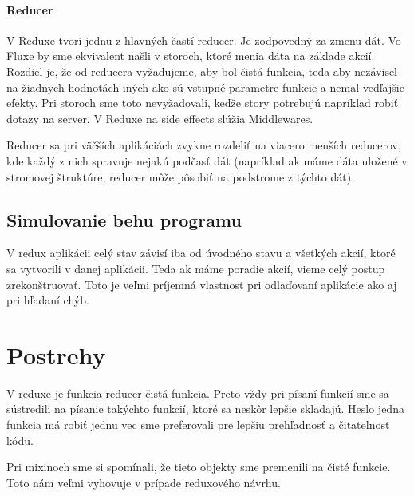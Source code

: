 \paragraph{Reducer}%
V Reduxe tvorí jednu z hlavných častí reducer. Je zodpovedný za zmenu dát. Vo Fluxe by sme ekvivalent našli v storoch, ktoré menia dáta na základe akcií. Rozdiel je, že od reducera vyžadujeme, aby bol čistá funkcia, teda aby nezávisel na žiadnych hodnotách iných ako sú vstupné parametre funkcie a nemal vedľajšie efekty. Pri storoch sme toto nevyžadovali, keďže story potrebujú napríklad robiť dotazy na server. V Reduxe na side effects slúžia Middlewares.

Reducer sa pri väčších aplikáciách zvykne rozdeliť na viacero menších reducerov, kde každý z nich spravuje nejakú podčasť dát (napríklad ak máme dáta uložené v stromovej štruktúre, reducer môže pôsobiť na podstrome z týchto dát).

\subsection{Simulovanie behu programu}
V redux aplikácii celý stav závisí iba od úvodného stavu a všetkých akcií, ktoré sa vytvorili v danej aplikácii. Teda ak máme poradie akcií, vieme celý postup zrekonštruovať. Toto je veľmi príjemná vlastnosť pri odlaďovaní aplikácie ako aj pri hľadaní chýb.

\section{Postrehy}
V reduxe je funkcia reducer čistá funkcia. Preto vždy pri písaní funkcií sme sa sústredili na písanie takýchto funkcií, ktoré sa neskôr lepšie skladajú. Heslo jedna funkcia má robiť jednu vec sme preferovali pre lepšiu prehľadnosť a čitateľnosť kódu.

Pri mixinoch sme si spomínali, že tieto objekty sme premenili na čisté funkcie. Toto nám veľmi vyhovuje v prípade reduxového návrhu.

